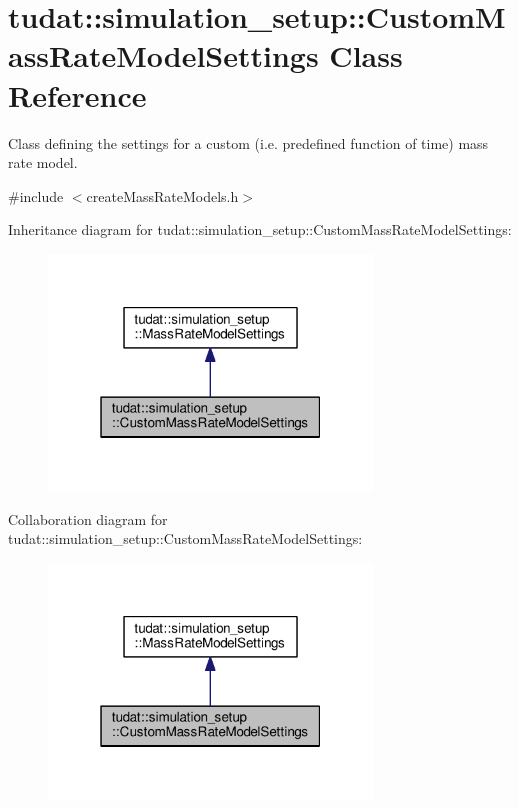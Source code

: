 \hypertarget{classtudat_1_1simulation__setup_1_1CustomMassRateModelSettings}{}\section{tudat\+:\+:simulation\+\_\+setup\+:\+:Custom\+Mass\+Rate\+Model\+Settings Class Reference}
\label{classtudat_1_1simulation__setup_1_1CustomMassRateModelSettings}


Class defining the settings for a custom (i.\+e. predefined function of time) mass rate model.  




{\ttfamily \#include $<$create\+Mass\+Rate\+Models.\+h$>$}



Inheritance diagram for tudat\+:\+:simulation\+\_\+setup\+:\+:Custom\+Mass\+Rate\+Model\+Settings\+:
\nopagebreak
\begin{figure}[H]
\begin{center}
\leavevmode
\includegraphics[width=244pt]{classtudat_1_1simulation__setup_1_1CustomMassRateModelSettings__inherit__graph}
\end{center}
\end{figure}


Collaboration diagram for tudat\+:\+:simulation\+\_\+setup\+:\+:Custom\+Mass\+Rate\+Model\+Settings\+:
\nopagebreak
\begin{figure}[H]
\begin{center}
\leavevmode
\includegraphics[width=244pt]{classtudat_1_1simulation__setup_1_1CustomMassRateModelSettings__coll__graph}
\end{center}
\end{figure}
